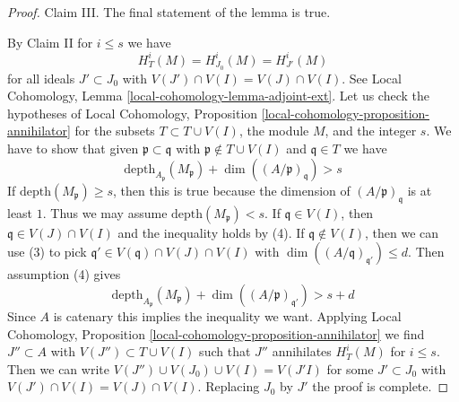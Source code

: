 \begin{proof}
\medskip\noindent
Claim III. The final statement of the lemma is true.

\medskip\noindent
By Claim II for $i \leq s$ we have
$$
H^i_T(M) = H^i_{J_0}(M) = H^i_{J'}(M)
$$
for all ideals $J' \subset J_0$ with $V(J')  \cap V(I) = V(J) \cap V(I)$.
See Local Cohomology, Lemma \ref{local-cohomology-lemma-adjoint-ext}.
Let us check the hypotheses of Local Cohomology,
Proposition \ref{local-cohomology-proposition-annihilator}
for the subsets $T \subset T \cup V(I)$, the module $M$, and the integer $s$.
We have to show that given $\mathfrak p \subset \mathfrak q$
with $\mathfrak p \not \in T \cup V(I)$ and $\mathfrak q \in T$
we have
$$
\text{depth}_{A_\mathfrak p}(M_\mathfrak p) +
\dim((A/\mathfrak p)_\mathfrak q) > s
$$
If $\text{depth}(M_\mathfrak p) \geq s$, then this is true because
the dimension of $(A/\mathfrak p)_\mathfrak q$ is at least $1$.
Thus we may assume $\text{depth}(M_\mathfrak p) < s$.
If $\mathfrak q \in V(I)$, then $\mathfrak q \in V(J) \cap V(I)$
and the inequality holds by (4). If $\mathfrak q \not \in V(I)$,
then we can use (3) to pick
$\mathfrak q' \in V(\mathfrak q) \cap V(J) \cap V(I)$ with
$\dim((A/\mathfrak q)_{\mathfrak q'}) \leq d$.
Then assumption (4) gives
$$
\text{depth}_{A_\mathfrak p}(M_\mathfrak p) +
\dim((A/\mathfrak p)_{\mathfrak q'}) > s + d
$$
Since $A$ is catenary this implies the inequality we want.
Applying Local Cohomology,
Proposition \ref{local-cohomology-proposition-annihilator} we
find $J'' \subset A$ with $V(J'') \subset T \cup V(I)$
such that $J''$ annihilates $H^i_T(M)$ for $i \leq s$.
Then we can write $V(J'') \cup V(J_0) \cup V(I) = V(J'I)$
for some $J' \subset J_0$ with $V(J') \cap V(I) = V(J) \cap V(I)$.
Replacing $J_0$ by $J'$ the proof is complete.
\end{proof}
